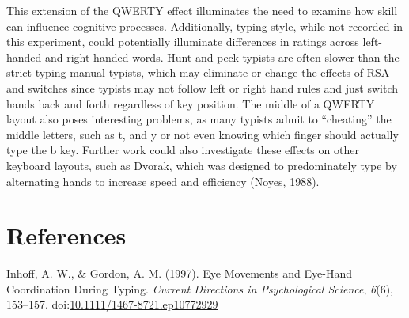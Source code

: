 \documentclass[english,man]{apa6}
\theoremstyle{definition}
\theoremstyle{definition}
\theoremstyle{definition}
\theoremstyle{remark}
\begin{document}
This extension of the QWERTY effect illuminates the need to examine how
skill can influence cognitive processes. Additionally, typing style,
while not recorded in this experiment, could potentially illuminate
differences in ratings across left-handed and right-handed words.
Hunt-and-peck typists are often slower than the strict typing manual
typists, which may eliminate or change the effects of RSA and switches
since typists may not follow left or right hand rules and just switch
hands back and forth regardless of key position. The middle of a QWERTY
layout also poses interesting problems, as many typists admit to
\enquote{cheating} the middle letters, such as t, and y or not even
knowing which finger should actually type the b key. Further work could
also investigate these effects on other keyboard layouts, such as
Dvorak, which was designed to predominately type by alternating hands to
increase speed and efficiency (Noyes, 1988).

\newpage

\section{References}\label{references}

\setlength{\parindent}{-0.5in} \setlength{\leftskip}{0.5in}

\hypertarget{refs}{}
\hypertarget{ref-Inhoff1997}{}
Inhoff, A. W., \& Gordon, A. M. (1997). Eye Movements and Eye-Hand
Coordination During Typing. \emph{Current Directions in Psychological
Science}, \emph{6}(6), 153--157.
doi:\href{https://doi.org/10.1111/1467-8721.ep10772929}{10.1111/1467-8721.ep10772929}
\end{document}

